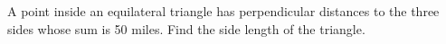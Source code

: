 A point inside an equilateral triangle has perpendicular distances to the three sides whose sum is 50 miles. Find the side length of the triangle.
